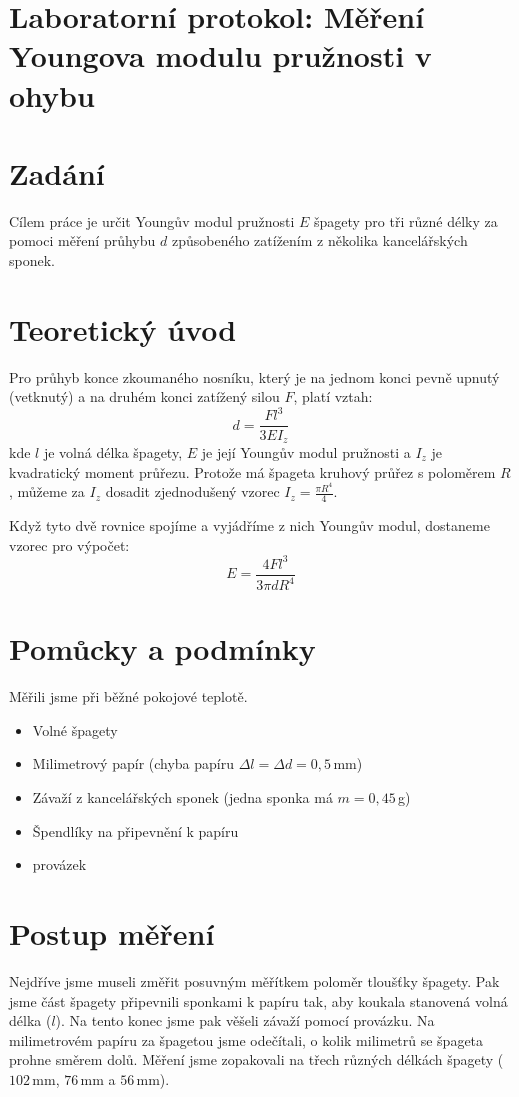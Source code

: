 \documentclass[a4paper,12pt]{article}
\begin{document}
\section*{Laboratorní protokol: Měření Youngova modulu pružnosti v ohybu}

\section{Zadání}
Cílem práce je určit Youngův modul pružnosti $E$ špagety pro tři různé délky za pomoci měření průhybu $d$ způsobeného zatížením z několika kancelářských sponek.

\section{Teoretický úvod}
Pro průhyb konce zkoumaného nosníku, který je na jednom konci pevně upnutý (vetknutý) a na druhém konci zatížený silou $F$, platí vztah:
\begin{equation}
d = \frac{F l^3}{3 E I_{z}}
\end{equation}
kde $l$ je volná délka špagety, $E$ je její Youngův modul pružnosti a $I_{z}$ je kvadratický moment průřezu. Protože má špageta kruhový průřez s poloměrem $R$, můžeme za $I_z$ dosadit zjednodušený vzorec $I_{z} = \frac{\pi R^4}{4}$. 

Když tyto dvě rovnice spojíme a vyjádříme z nich Youngův modul, dostaneme vzorec pro výpočet:
\begin{equation}
E = \frac{4 F l^3}{3 \pi d R^4}
\end{equation}

\section{Pomůcky a podmínky}
Měřili jsme při běžné pokojové teplotě.
\begin{itemize}
    \item Volné špagety
    \item Milimetrový papír (chyba papíru $\Delta l = \Delta d = 0,5$\,mm)
    \item Závaží z kancelářských sponek (jedna sponka má $m = 0,45$\,g)
    \item Špendlíky na připevnění k papíru
    \item provázek
\end{itemize}

\section{Postup měření}
Nejdříve jsme museli změřit posuvným měřítkem poloměr tloušťky špagety. Pak jsme část špagety připevnili sponkami k papíru tak, aby koukala stanovená volná délka ($l$). Na tento konec jsme pak věšeli závaží pomocí provázku. Na milimetrovém papíru za špagetou jsme odečítali, o kolik milimetrů se špageta prohne směrem dolů. Měření jsme zopakovali na třech různých délkách špagety ($102$\,mm, $76$\,mm a $56$\,mm).
\end{document}
